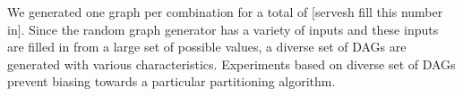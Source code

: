 We generated one graph per combination for a total of [servesh fill this number
in]. Since the random graph generator has a variety of inputs and these inputs
are filled in from a large set of possible values, a diverse set of DAGs are
generated with various characteristics. Experiments based on diverse set of DAGs
prevent biasing towards a particular partitioning algorithm.



